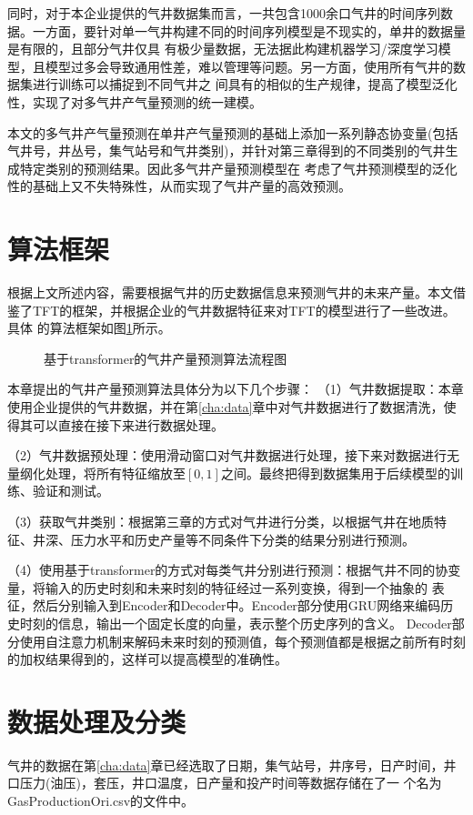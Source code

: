 同时，对于本企业提供的气井数据集而言，一共包含1000余口气井的时间序列数据。一方面，要针对单一气井构建不同的时间序列模型是不现实的，单井的数据量是有限的，且部分气井仅具
有极少量数据，无法据此构建机器学习/深度学习模型，且模型过多会导致通用性差，难以管理等问题。另一方面，使用所有气井的数据集进行训练可以捕捉到不同气井之
间具有的相似的生产规律，提高了模型泛化性，实现了对多气井产气量预测的统一建模。

本文的多气井产气量预测在单井产气量预测的基础上添加一系列静态协变量(包括气井号，井丛号，集气站号和气井类别)，并针对第三章得到的不同类别的气井生成特定类别的预测结果。因此多气井产量预测模型在
考虑了气井预测模型的泛化性的基础上又不失特殊性，从而实现了气井产量的高效预测。
\section{算法框架}
根据上文所述内容，需要根据气井的历史数据信息来预测气井的未来产量。本文借鉴了TFT的框架，并根据企业的气井数据特征来对TFT的模型进行了一些改进。具体
的算法框架如图\ref{fig:TFTprogess}所示。
\begin{figure}[H]
    \label{fig:TFTprogess}
    \caption{基于transformer的气井产量预测算法流程图}
\end{figure}
本章提出的气井产量预测算法具体分为以下几个步骤：
（1）气井数据提取：本章使用企业提供的气井数据，并在第\ref{cha:data}章中对气井数据进行了数据清洗，使得其可以直接在接下来进行数据处理。

（2）气井数据预处理：使用滑动窗口对气井数据进行处理，接下来对数据进行无量纲化处理，将所有特征缩放至$[0,1]$之间。最终把得到数据集用于后续模型的训练、验证和测试。

（3）获取气井类别：根据第三章的方式对气井进行分类，以根据气井在地质特征、井深、压力水平和历史产量等不同条件下分类的结果分别进行预测。

（4）使用基于transformer的方式对每类气井分别进行预测：根据气井不同的协变量，将输入的历史时刻和未来时刻的特征经过一系列变换，得到一个抽象的
表征，然后分别输入到Encoder和Decoder中。Encoder部分使用GRU网络来编码历史时刻的信息，输出一个固定长度的向量，表示整个历史序列的含义。
Decoder部分使用自注意力机制来解码未来时刻的预测值，每个预测值都是根据之前所有时刻的加权结果得到的，这样可以提高模型的准确性。
\section{数据处理及分类}
\label{sec:datafoc}
气井的数据在第\ref{cha:data}章已经选取了日期，集气站号，井序号，日产时间，井口压力(油压)，套压，井口温度，日产量和投产时间等数据存储在了一
个名为GasProductionOri.csv的文件中。

